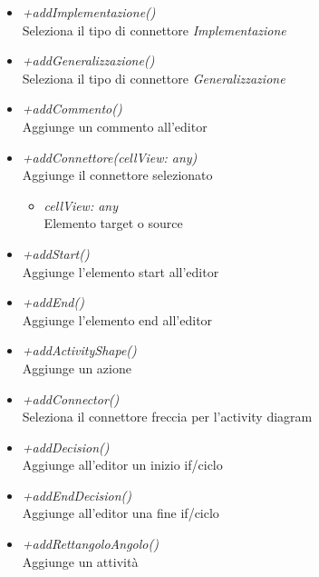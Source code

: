 \begin{itemize}
\begin{itemize}
    		\item \emph{+addImplementazione()}\\
    		Seleziona il tipo di connettore \textit{Implementazione}
    		\item \emph{+addGeneralizzazione()}\\
    		Seleziona il tipo di connettore \textit{Generalizzazione}
    		\item \emph{+addCommento()}\\
    		Aggiunge un commento all'editor
    		\item \emph{+addConnettore(cellView: any)}\\
    		Aggiunge il connettore selezionato
    			\begin{itemize}
    			\item \emph{cellView: any}\\
    			Elemento target o source
    		\end{itemize}
    		\item \emph{+addStart()}\\
    		Aggiunge l'elemento start all'editor
    		\item \emph{+addEnd()}\\
    		Aggiunge l'elemento end all'editor
    		\item \emph{+addActivityShape()}\\
    		Aggiunge un azione
    		\item \emph{+addConnector()}\\
    		Seleziona il connettore freccia per l'activity diagram
    		\item \emph{+addDecision()}\\
    		Aggiunge all'editor un inizio if/ciclo
    		\item \emph{+addEndDecision()}\\
    		Aggiunge all'editor una fine if/ciclo
    		\item \emph{+addRettangoloAngolo()}\\
    		Aggiunge un attività
		\end{itemize}
\end{itemize}